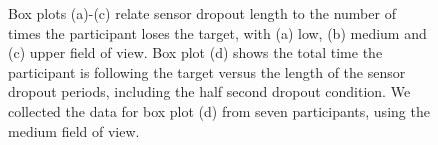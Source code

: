 \documentclass{acmsiggraph}                     %
\begin{document}

\begin{figure}[t]
	\centering
	\caption{\label{fig:interaction}Box plots (a)-(c) relate sensor dropout length to the number of times the participant loses the target, with (a) low, (b) medium and (c) upper field of view.  Box plot (d) shows the total time the participant is following the target versus the length of the sensor dropout periods, including the half second dropout condition.  We collected the data for box plot (d) from seven participants, using the medium field of view.}
\end{figure}
\end{document}
